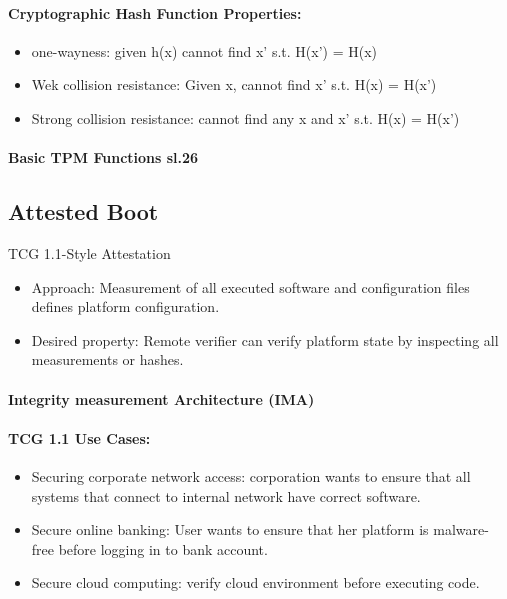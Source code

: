 \paragraph{Cryptographic Hash Function Properties: } 
\begin{itemize}
    \item one-wayness: given h(x) cannot find x' s.t. H(x') = H(x)
    \item Wek collision resistance: Given x, cannot find x' s.t. H(x) = H(x')
    \item Strong collision resistance: cannot find any x and x' s.t. H(x) = H(x')
\end{itemize}{}

\paragraph{Basic TPM Functions sl.26}

\subsection{Attested Boot}
TCG 1.1-Style Attestation
\begin{itemize}
    \item Approach: Measurement of all executed software and configuration files defines platform configuration.
    \item Desired property: Remote verifier can verify platform state by inspecting all measurements or hashes.
\end{itemize}{}

\paragraph{Integrity measurement Architecture (IMA)}

\paragraph{TCG 1.1 Use Cases: }
\begin{itemize}
    \item Securing corporate network access: corporation wants to ensure that all systems that connect to internal network have correct software.
    \item Secure online banking: User wants to ensure that her platform is malware- free before logging in to bank account. 
    \item Secure cloud computing: verify cloud environment before executing code.
\end{itemize}{}

